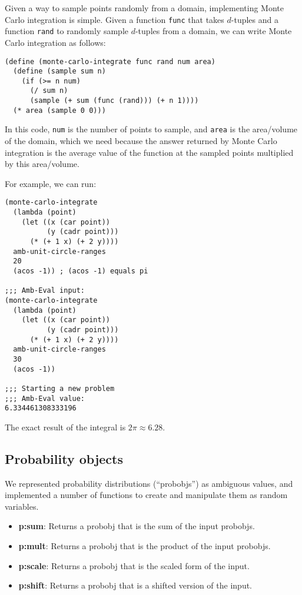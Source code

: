 \documentclass{article}
\begin{document}
Given a way to sample points randomly from a domain, implementing
Monte Carlo integration is simple. Given a function \texttt{func} that
takes $d$-tuples and a function \texttt{rand} to randomly sample
$d$-tuples from a domain, we can write Monte Carlo integration as
follows:
\begin{lstlisting}
(define (monte-carlo-integrate func rand num area)
  (define (sample sum n)
    (if (>= n num)
      (/ sum n)
      (sample (+ sum (func (rand))) (+ n 1))))
  (* area (sample 0 0)))
\end{lstlisting}
In this code, \texttt{num} is the number of points to sample, and
\texttt{area} is the area/volume of the domain, which we need because
the answer returned by Monte Carlo integration is the average value of
the function at the sampled points multiplied by this area/volume.

For example, we can run:
\begin{lstlisting}
(monte-carlo-integrate
  (lambda (point)
    (let ((x (car point))
          (y (cadr point)))
      (* (+ 1 x) (+ 2 y))))
  amb-unit-circle-ranges
  20
  (acos -1)) ; (acos -1) equals pi

;;; Amb-Eval input:
(monte-carlo-integrate
  (lambda (point)
    (let ((x (car point))
          (y (cadr point)))
      (* (+ 1 x) (+ 2 y))))
  amb-unit-circle-ranges
  30
  (acos -1))

;;; Starting a new problem
;;; Amb-Eval value:
6.334461308333196
\end{lstlisting}
The exact result of the integral is $2\pi \approx 6.28$.

\subsection{Probability objects}

We represented probability distributions (``probobjs'') as ambiguous
values, and implemented a number of functions to create and manipulate
them as random variables.
\begin{itemize}
\item \textbf{p:sum}: Returns a {probobj} that is the sum of the input
  {probobj}s.
\item \textbf{p:mult}: Returns a {probobj} that is the product of the
  input {probobj}s.
\item \textbf{p:scale}: Returns a {probobj} that is the scaled form of
  the input.
\item \textbf{p:shift}: Returns a {probobj} that is a shifted version
  of the input.
\end{itemize}
\end{document}
